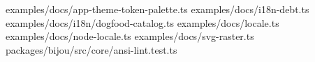 \begin{itemize}
\allowbreak{}e\allowbreak{}x\allowbreak{}a\allowbreak{}m\allowbreak{}p\allowbreak{}l\allowbreak{}e\allowbreak{}s\allowbreak{}/\allowbreak{}d\allowbreak{}o\allowbreak{}c\allowbreak{}s\allowbreak{}/\allowbreak{}a\allowbreak{}p\allowbreak{}p\allowbreak{}-\allowbreak{}t\allowbreak{}h\allowbreak{}e\allowbreak{}m\allowbreak{}e\allowbreak{}-\allowbreak{}t\allowbreak{}o\allowbreak{}k\allowbreak{}e\allowbreak{}n\allowbreak{}-\allowbreak{}p\allowbreak{}a\allowbreak{}l\allowbreak{}e\allowbreak{}t\allowbreak{}t\allowbreak{}e\allowbreak{}.\allowbreak{}t\allowbreak{}s\allowbreak{} \allowbreak{}e\allowbreak{}x\allowbreak{}a\allowbreak{}m\allowbreak{}p\allowbreak{}l\allowbreak{}e\allowbreak{}s\allowbreak{}/\allowbreak{}d\allowbreak{}o\allowbreak{}c\allowbreak{}s\allowbreak{}/\allowbreak{}i\allowbreak{}1\allowbreak{}8\allowbreak{}n\allowbreak{}-\allowbreak{}d\allowbreak{}e\allowbreak{}b\allowbreak{}t\allowbreak{}.\allowbreak{}t\allowbreak{}s\allowbreak{} \allowbreak{}e\allowbreak{}x\allowbreak{}a\allowbreak{}m\allowbreak{}p\allowbreak{}l\allowbreak{}e\allowbreak{}s\allowbreak{}/\allowbreak{}d\allowbreak{}o\allowbreak{}c\allowbreak{}s\allowbreak{}/\allowbreak{}i\allowbreak{}1\allowbreak{}8\allowbreak{}n\allowbreak{}/\allowbreak{}d\allowbreak{}o\allowbreak{}g\allowbreak{}f\allowbreak{}o\allowbreak{}o\allowbreak{}d\allowbreak{}-\allowbreak{}c\allowbreak{}a\allowbreak{}t\allowbreak{}a\allowbreak{}l\allowbreak{}o\allowbreak{}g\allowbreak{}.\allowbreak{}t\allowbreak{}s\allowbreak{} \allowbreak{}e\allowbreak{}x\allowbreak{}a\allowbreak{}m\allowbreak{}p\allowbreak{}l\allowbreak{}e\allowbreak{}s\allowbreak{}/\allowbreak{}d\allowbreak{}o\allowbreak{}c\allowbreak{}s\allowbreak{}/\allowbreak{}l\allowbreak{}o\allowbreak{}c\allowbreak{}a\allowbreak{}l\allowbreak{}e\allowbreak{}.\allowbreak{}t\allowbreak{}s\allowbreak{} \allowbreak{}e\allowbreak{}x\allowbreak{}a\allowbreak{}m\allowbreak{}p\allowbreak{}l\allowbreak{}e\allowbreak{}s\allowbreak{}/\allowbreak{}d\allowbreak{}o\allowbreak{}c\allowbreak{}s\allowbreak{}/\allowbreak{}n\allowbreak{}o\allowbreak{}d\allowbreak{}e\allowbreak{}-\allowbreak{}l\allowbreak{}o\allowbreak{}c\allowbreak{}a\allowbreak{}l\allowbreak{}e\allowbreak{}.\allowbreak{}t\allowbreak{}s\allowbreak{} \allowbreak{}e\allowbreak{}x\allowbreak{}a\allowbreak{}m\allowbreak{}p\allowbreak{}l\allowbreak{}e\allowbreak{}s\allowbreak{}/\allowbreak{}d\allowbreak{}o\allowbreak{}c\allowbreak{}s\allowbreak{}/\allowbreak{}s\allowbreak{}v\allowbreak{}g\allowbreak{}-\allowbreak{}r\allowbreak{}a\allowbreak{}s\allowbreak{}t\allowbreak{}e\allowbreak{}r\allowbreak{}.\allowbreak{}t\allowbreak{}s\allowbreak{} \allowbreak{}p\allowbreak{}a\allowbreak{}c\allowbreak{}k\allowbreak{}a\allowbreak{}g\allowbreak{}e\allowbreak{}s\allowbreak{}/\allowbreak{}b\allowbreak{}i\allowbreak{}j\allowbreak{}o\allowbreak{}u\allowbreak{}/\allowbreak{}s\allowbreak{}r\allowbreak{}c\allowbreak{}/\allowbreak{}c\allowbreak{}o\allowbreak{}r\allowbreak{}e\allowbreak{}/\allowbreak{}a\allowbreak{}n\allowbreak{}s\allowbreak{}i\allowbreak{}-\allowbreak{}l\allowbreak{}i\allowbreak{}n\allowbreak{}t\allowbreak{}.\allowbreak{}t\allowbreak{}e\allowbreak{}s\allowbreak{}t\allowbreak{}.\allowbreak{}t\allowbreak{}s\allowbreak{} 
\end{itemize}
